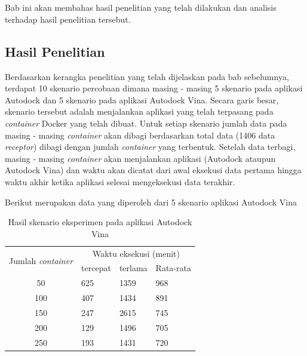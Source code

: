 \chapter{\babEmpat}
Bab ini akan membahas hasil penelitian yang telah dilakukan dan analisis terhadap
hasil penelitian tersebut. 

\section{Hasil Penelitian}
\hspace{0.5cm}Berdasarkan kerangka penelitian yang telah dijelaskan pada bab sebelumnya, terdapat 10 skenario percobaan dimana masing - masing 5 skenario pada aplikasi Autodock dan 5 skenario pada aplikasi Autodock Vina. Secara garis besar, skenario tersebut adalah menjalankan aplikasi yang telah terpasang pada \textit{container} Docker yang telah dibuat. Untuk setiap skenario jumlah data pada masing - masing \textit{container} akan dibagi berdasarkan total data (1406 data \textit{receptor}) dibagi dengan jumlah \textit{container} yang terbentuk. Setelah data terbagi, masing - masing \textit{container} akan menjalankan aplikasi (Autodock ataupun Autodock Vina) dan waktu akan dicatat dari awal eksekusi data pertama hingga waktu akhir ketika aplikasi selesai mengeksekusi data terakhir.

Berikut merupakan data yang diperoleh dari 5 skenario aplikasi Autodock Vina

\begin{table}[h]
	\centering
	\begin{tabular}{|c|l|l|l|}
		\hline
		\multirow{2}{*}{Jumlah \textit{container}} & \multicolumn{3}{c|}{Waktu eksekusi (menit)} \\ \cline{2-4} 
		& \multicolumn{1}{c|}{tercepat} & \multicolumn{1}{c|}{terlama} & \multicolumn{1}{c|}{Rata-rata} \\ \hline
		50 & 625 & 1359 & 968 \\ \hline
		100 & 407 & 1434 & 891 \\ \hline
		150 & 247 & 2615 & 745 \\ \hline
		200 & 129 & 1496 & 705 \\ \hline
		250 & 193 & 1431 & 720 \\ \hline
	\end{tabular}
		\caption{Hasil skenario eksperimen pada aplikasi Autodock Vina}
		\label{my-label}
\end{table}

